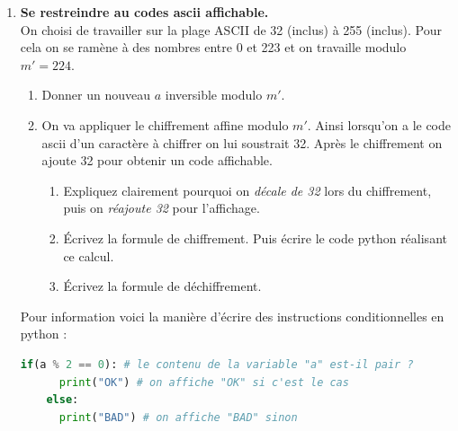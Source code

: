 \documentclass[12pt,a4paper]{article}
\begin{document}
\begin{enumerate}
  \item \textbf{Se restreindre au codes ascii affichable.}\\
  On choisi de travailler sur la plage ASCII de 32 (inclus) à 255 (inclus).
  Pour cela on se ramène à des nombres entre 0 et 223 et on travaille modulo $m'=224$.
  \begin{enumerate}
    \item Donner un nouveau $a$ inversible modulo $m'$.
    \item On va appliquer le chiffrement affine modulo $m'$.
    Ainsi lorsqu'on a le code ascii d'un caractère à chiffrer on lui soustrait 32.
    Après le chiffrement on ajoute 32 pour obtenir un code affichable.
    \begin{enumerate}
        \item Expliquez clairement pourquoi on \emph{décale de 32} lors du chiffrement, puis on \emph{réajoute 32} pour l'affichage.
        \item Écrivez la formule de chiffrement. Puis écrire le code python réalisant ce calcul.
        \item Écrivez la formule de déchiffrement.%
    \end{enumerate}
  \end{enumerate}
  \vfill
  \begin{tcolorbox}
    Pour information voici la manière d'écrire des instructions conditionnelles en python :
  \begin{lstlisting}[language=Python]
    if(a % 2 == 0): # le contenu de la variable "a" est-il pair ?
      print("OK") # on affiche "OK" si c'est le cas
    else:
      print("BAD") # on affiche "BAD" sinon
  \end{lstlisting}
  \end{tcolorbox}

  


\end{enumerate}
\end{document}

